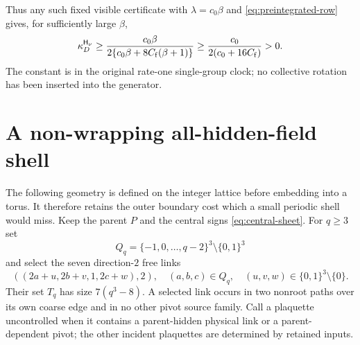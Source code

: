 \documentclass[11pt,oneside,openany]{book}
\theoremstyle{definition}
\theoremstyle{remark}
\begin{document}
Thus any such fixed visible certificate with $\lambda=c_0\beta$ and
\cref{eq:preintegrated-row} gives, for sufficiently large $\beta$,
\begin{equation}\label{eq:uniform-repair-template}
 \kappa_D^{\mathsf H_\nu}\ge
 \frac{c_0\beta}{2\{c_0\beta+8C_{\rm f}(\beta+1)\}}
 \ge\frac{c_0}{2(c_0+16C_{\rm f})}>0.
\end{equation}
The constant is in the original rate-one single-group clock; no
collective rotation has been inserted into the generator.

\section{A non-wrapping all-hidden-field shell}
\label{sec:nonwrapping-repair}
The following geometry is defined on the integer lattice before
embedding into a torus. It therefore retains the outer boundary cost
which a small periodic shell would miss. Keep the parent $P$ and the
central signs \cref{eq:central-sheet}. For $q\ge3$ set
\[
 Q_q=\{-1,0,\ldots,q-2\}^3\setminus\{0,1\}^3
\]
and select the seven direction-$2$ free links
\[
 ((2a+u,2b+v,1,2c+w),2),\quad
 (a,b,c)\in Q_q,\quad
 (u,v,w)\in\{0,1\}^3\setminus\{0\}.
\]
Their set $T_q$ has size $7(q^3-8)$. A selected link occurs in two
nonroot paths over its own coarse edge and in no other pivot source
family. Call a plaquette uncontrolled when it contains a parent-hidden
physical link or a parent-dependent pivot; the other incident
plaquettes are determined by retained inputs.
\end{document}

